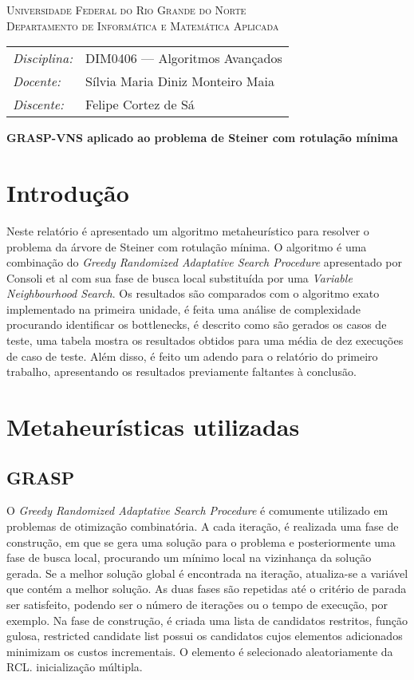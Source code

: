\documentclass[12pt, a4paper]{article}
\begin{document}
\begin{center}
    \textsc{Universidade Federal do Rio Grande do Norte} \\
    \textsc{Departamento de Informática e Matemática Aplicada}
\end{center}

\bigskip

\begin{tabular}{@{}ll@{}}
    \emph{Disciplina:} & DIM0406 --- Algoritmos Avançados \\
    \emph{Docente:}    & Sílvia Maria Diniz Monteiro Maia \\
    \emph{Discente:}   & Felipe Cortez de Sá \\
\end{tabular}

\bigskip

\begin{center}
\large \textbf{GRASP-VNS aplicado ao problema de Steiner com rotulação mínima}
\end{center}

\section{Introdução}
Neste relatório é apresentado um algoritmo metaheurístico para resolver o
problema da árvore de Steiner com rotulação mínima. O algoritmo é uma
combinação do \emph{Greedy Randomized Adaptative Search Procedure} apresentado
por Consoli et al \cite{consoli} com sua fase de busca local substituída por
uma \emph{Variable Neighbourhood Search}. Os resultados são comparados com o
algoritmo exato implementado na primeira unidade, é feita uma análise de
complexidade procurando identificar os bottlenecks, é descrito como são gerados
os casos de teste, uma tabela mostra os resultados obtidos para uma média de
dez execuções de caso de teste. Além disso, é feito um adendo para o relatório
do primeiro trabalho, apresentando os resultados previamente faltantes à
conclusão.

\section{Metaheurísticas utilizadas}
\subsection{GRASP}
O \emph{Greedy Randomized Adaptative Search Procedure} é comumente utilizado em
problemas de otimização combinatória. A cada iteração, é realizada uma fase de
construção, em que se gera uma solução para o problema e posteriormente uma
fase de busca local, procurando um mínimo local na vizinhança da solução
gerada. Se a melhor solução global é encontrada na iteração, atualiza-se a
variável que contém a melhor solução. As duas fases são repetidas até o
critério de parada ser satisfeito, podendo ser o número de iterações ou o tempo
de execução, por exemplo. Na fase de construção, é criada uma lista de
candidatos restritos,
função gulosa, restricted candidate list possui os candidatos cujos elementos
adicionados minimizam os custos incrementais. O elemento é selecionado
aleatoriamente da RCL.
inicialização múltipla.
\end{document}
